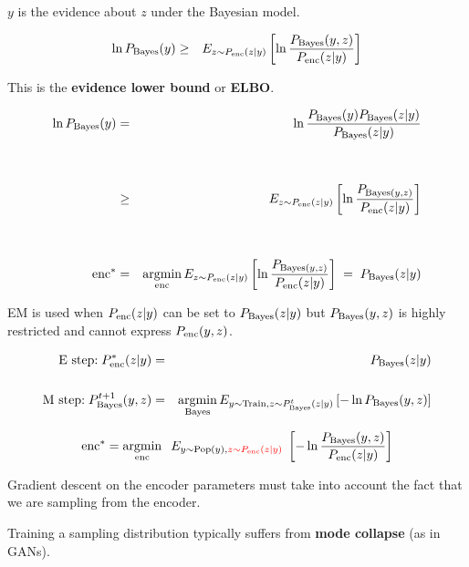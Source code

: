 {
$y$ is the evidence about $z$ under the Bayesian model.

\vfill
{\color{red}
{\huge
\begin{eqnarray*}
\ln P_{\mathrm{Bayes}}(y) & \geq & E_{z \sim P_{\mathrm{enc}}(z|y)}\left[\ln \frac{P_{\mathrm{Bayes}}(y,z)}{P_{\mathrm{enc}}(z|y)}\right]
\end{eqnarray*}
}}



\vfill
This is the {\bf evidence lower bound} or {\bf ELBO}.


{\color{red}
{\huge
\begin{eqnarray*}
\ln P_{\mathrm{Bayes}}(y) & =  & \ln \frac{P_{\mathrm{Bayes}}(y)P_{\mathrm{Bayes}}(z|y)}{P_{\mathrm{Bayes}}(z|y)} \\
\\
\\
& \geq & E_{z \sim P_{\mathrm{enc}}(z|y)}\left[\ln \frac{P_{\mathrm{Bayes}(y,z)}}{P_{\mathrm{enc}}(z|y)}\right] \\
\\
\\
\mathrm{enc}^* & = & \operatorname*{argmin}_{\mathrm{enc}} E_{z \sim P_{\mathrm{enc}}(z|y)}\left[\ln \frac{P_{\mathrm{Bayes}(y,z)}}{P_{\mathrm{enc}}(z|y)}\right] \;=\; P_{\mathrm{Bayes}}(z|y)
\end{eqnarray*}
}}



EM is used when $P_{\mathrm{enc}}(z|y)$ can be set to $P_{\mathrm{Bayes}}(z|y)$ but
$P_{\mathrm{Bayes}}(y,z)$ is highly restricted and cannot express $P_{\mathrm{enc}}(y,z)$.

{\huge
\vfill
\begin{eqnarray*}
\mbox{E step:}\;P_{\mathrm{enc}}^*(z|y) & = & P_{\mathrm{Bayes}}(z|y) \\
\\
\mbox{M step:}\;P_{\mathrm{Bayes}}^{t+1}(y,z) & = & \operatorname*{argmin}_{\mathrm{Bayes}} E_{y \sim \mathrm{Train}, z \sim P_{\mathrm{Bayes}}^t(z|y)} \left[-\ln P_{\mathrm{Bayes}}(y,z)\right]
\end{eqnarray*}
}



$$\mathrm{enc}^* = \operatorname*{argmin}_{\mathrm{enc}}\;\;E_{y\sim \mathrm{Pop}(y),{\color{red} z\sim P_{\mathrm{enc}}(z|y)}}\;\left[- \ln \frac{P_{\mathrm{Bayes}}(y,z)}{P_{\mathrm{enc}}(z|y)}\right]$$

\vfill
Gradient descent on the encoder parameters must take into account the fact that we are sampling from the encoder.

\vfill
Training a sampling distribution typically suffers from {\bf mode collapse} (as in GANs).

}
